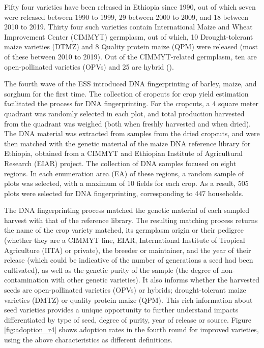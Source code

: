\documentclass[11pt]{article}
\begin{document}
Fifty four varieties have been released in Ethiopia since 1990, out of which seven were released between 1990 to 1999, 29 between 2000 to 2009, and 18 between 2010 to 2019. Thirty four such varieties contain International Maize and Wheat Improvement Center (CIMMYT) germplasm, out of which, 10 Drought-tolerant maize varieties (DTMZ) and 8 Quality protein maize (QPM) were released (most of these between 2010 to 2019). Out of the CIMMYT-related germplasm, ten are open-pollinated varieties (OPVs) and 25 are hybrid (\citep{kosmowski2020shining}).

The fourth wave of the ESS introduced DNA fingerprinting of barley, maize, and sorghum for the first time. The collection of cropcuts for crop yield estimation facilitated the process for DNA fingerprinting. For the cropcuts, a 4 square meter quadrant was randomly selected in each plot, and total production harvested from the quadrant was weighed (both when freshly harvested and when dried). The DNA material was extracted from samples from the dried cropcuts, and were then matched with the genetic material of the maize DNA reference library for Ethiopia, obtained from a CIMMYT and Ethiopian Institute of Agricultural Research (EIAR) project. The collection of DNA samples focused on eight regions. In each enumeration area (EA) of these regions, a random sample of plots was selected, with a maximum of 10 fields for each crop. As a result, 505 plots were selected for DNA fingerprinting, corresponding to 447 households. 

The DNA fingerprinting process matched the genetic material of each sampled harvest with that of the reference library. The resulting matching process returns the name of the crop variety matched, its germplasm origin or their pedigree (whether they are a CIMMYT line, EIAR,  International Institute of Tropical Agriculture (IITA) or private), the breeder or maintainer, and the year of their release (which could be indicative of the number of generations a seed had been cultivated), as well as the genetic purity of the sample (the degree of non-contamination with other genetic varieties). It also informs whether the harvested seeds are open-pollinated varieties (OPVs) or hybrids; drought-tolerant maize varieties (DMTZ) or quality protein maize (QPM). This rich information about seed varieties provides a unique opportunity to further understand impacts differentiated by type of seed, degree of purity, year of release or source. Figure \ref{fig:adoption_r4} shows adoption rates in the fourth round for improved varieties, using the above characteristics as different definitions.
\end{document}
